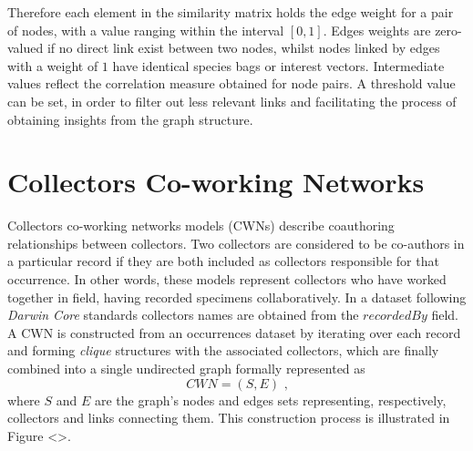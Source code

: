 Therefore each element in the similarity matrix holds the edge weight for a pair of nodes, with a value ranging within the interval $[0,1]$. Edges weights are zero-valued if no direct link exist between two nodes,  whilst nodes linked by edges with a weight of $1$ have identical species bags or interest vectors. Intermediate values reflect the correlation measure obtained for node pairs. A threshold value can be set, in order to filter out less relevant links and facilitating the process of obtaining insights from the graph structure.



\section{Collectors Co-working Networks}




Collectors co-working networks models (CWNs) describe coauthoring relationships between collectors. Two collectors are considered to be co-authors in a particular record if they are both included as collectors responsible for that occurrence. In other words, these models represent collectors who have worked together in field, having recorded specimens collaboratively.
In a dataset following \textit{Darwin Core} standards collectors names are obtained from the $recordedBy$ field.
A CWN is constructed from an occurrences dataset by iterating over each record and forming \textit{clique} structures with the associated collectors, which are finally combined into a single undirected graph formally represented as 
$$CWN = (S,E) \mbox{ ,}$$
where $S$ and $E$ are the graph's nodes and edges sets representing, respectively, collectors and links connecting them. This construction process is illustrated in Figure <>. %

